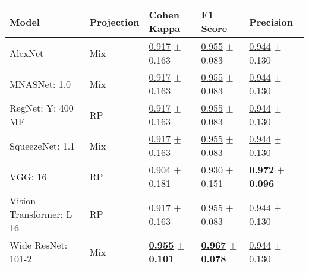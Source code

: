 
\begin{tabular}{lllll}
\toprule
Model & Projection & Cohen Kappa & F1 Score & Precision \\
\midrule
AlexNet & Mix & \underline{\textcolor[rgb]{0.7518796992,0.2481203008,0}{0.917}} $\pm$ \textcolor[rgb]{0.7679332798,0.2320667202,0}{0.163} & \underline{\textcolor[rgb]{0.3225806452,0.5000000000,0}{0.955}} $\pm$ \textcolor[rgb]{0.0708230834,0.5000000000,0}{0.083} & \underline{\textcolor[rgb]{1.0000000000,0.0000000000,0}{0.944}} $\pm$ \textcolor[rgb]{1.0000000000,0.0000000000,0}{0.130} \\
MNASNet: 1.0 & Mix & \underline{\textcolor[rgb]{0.7518796992,0.2481203008,0}{0.917}} $\pm$ \textcolor[rgb]{0.7679332798,0.2320667202,0}{0.163} & \underline{\textcolor[rgb]{0.3225806452,0.5000000000,0}{0.955}} $\pm$ \textcolor[rgb]{0.0708230834,0.5000000000,0}{0.083} & \underline{\textcolor[rgb]{1.0000000000,0.0000000000,0}{0.944}} $\pm$ \textcolor[rgb]{1.0000000000,0.0000000000,0}{0.130} \\
RegNet: Y; 400 MF & RP & \underline{\textcolor[rgb]{0.7518796992,0.2481203008,0}{0.917}} $\pm$ \textcolor[rgb]{0.7679332798,0.2320667202,0}{0.163} & \underline{\textcolor[rgb]{0.3225806452,0.5000000000,0}{0.955}} $\pm$ \textcolor[rgb]{0.0708230834,0.5000000000,0}{0.083} & \underline{\textcolor[rgb]{1.0000000000,0.0000000000,0}{0.944}} $\pm$ \textcolor[rgb]{1.0000000000,0.0000000000,0}{0.130} \\
SqueezeNet: 1.1 & Mix & \underline{\textcolor[rgb]{0.7518796992,0.2481203008,0}{0.917}} $\pm$ \textcolor[rgb]{0.7679332798,0.2320667202,0}{0.163} & \underline{\textcolor[rgb]{0.3225806452,0.5000000000,0}{0.955}} $\pm$ \textcolor[rgb]{0.0708230834,0.5000000000,0}{0.083} & \underline{\textcolor[rgb]{1.0000000000,0.0000000000,0}{0.944}} $\pm$ \textcolor[rgb]{1.0000000000,0.0000000000,0}{0.130} \\
VGG: 16 & RP & \underline{\textcolor[rgb]{1.0000000000,0.0000000000,0}{0.904}} $\pm$ \textcolor[rgb]{1.0000000000,0.0000000000,0}{0.181} & \underline{\textcolor[rgb]{1.0000000000,0.0000000000,0}{0.930}} $\pm$ \textcolor[rgb]{1.0000000000,0.0000000000,0}{0.151} & \underline{\textbf{\textcolor[rgb]{0.0000000000,0.5000000000,0}{0.972}}} $\pm$ \textbf{\textcolor[rgb]{0.0000000000,0.5000000000,0}{0.096}} \\
Vision Transformer: L 16 & RP & \underline{\textcolor[rgb]{0.7518796992,0.2481203008,0}{0.917}} $\pm$ \textcolor[rgb]{0.7679332798,0.2320667202,0}{0.163} & \underline{\textcolor[rgb]{0.3225806452,0.5000000000,0}{0.955}} $\pm$ \textcolor[rgb]{0.0708230834,0.5000000000,0}{0.083} & \underline{\textcolor[rgb]{1.0000000000,0.0000000000,0}{0.944}} $\pm$ \textcolor[rgb]{1.0000000000,0.0000000000,0}{0.130} \\
Wide ResNet: 101-2 & Mix & \underline{\textbf{\textcolor[rgb]{0.0000000000,0.5000000000,0}{0.955}}} $\pm$ \textbf{\textcolor[rgb]{0.0000000000,0.5000000000,0}{0.101}} & \underline{\textbf{\textcolor[rgb]{0.0000000000,0.5000000000,0}{0.967}}} $\pm$ \textbf{\textcolor[rgb]{0.0000000000,0.5000000000,0}{0.078}} & \underline{\textcolor[rgb]{1.0000000000,0.0000000000,0}{0.944}} $\pm$ \textcolor[rgb]{1.0000000000,0.0000000000,0}{0.130} \\
\bottomrule
\end{tabular}

